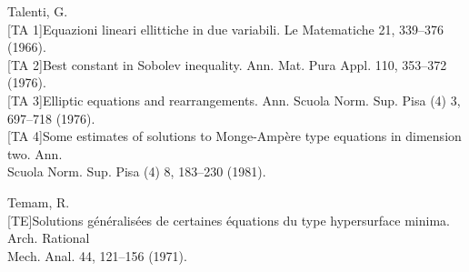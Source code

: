 \begin{flushleft}
Talenti, G.\\
{}[TA 1]\quad Equazioni lineari ellittiche in due variabili. Le Matematiche 21, 339--376 (1966).\\
{}[TA 2]\quad Best constant in Sobolev inequality. Ann. Mat. Pura Appl. 110, 353--372 (1976).\\
{}[TA 3]\quad Elliptic equations and rearrangements. Ann. Scuola Norm. Sup. Pisa (4) 3, 697--718 (1976).\\
{}[TA 4]\quad Some estimates of solutions to Monge-Ampère type equations in dimension two. Ann.\\
Scuola Norm. Sup. Pisa (4) 8, 183--230 (1981).

Temam, R.\\
{}[TE]\quad Solutions généralisées de certaines équations du type hypersurface minima. Arch. Rational\\
Mech. Anal. 44, 121--156 (1971).


\end{flushleft}
